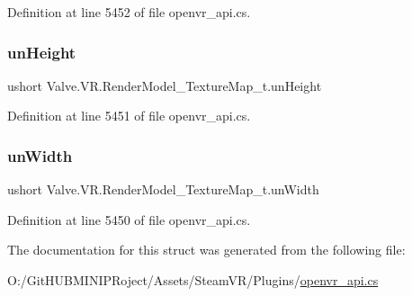 Definition at line 5452 of file openvr\+\_\+api.\+cs.

\mbox{\label{struct_valve_1_1_v_r_1_1_render_model___texture_map__t_aa332e5d1d5260294e2f1871d494950e1}} 
\subsubsection{\texorpdfstring{unHeight}{unHeight}}
{\footnotesize\ttfamily ushort Valve.\+V\+R.\+Render\+Model\+\_\+\+Texture\+Map\+\_\+t.\+un\+Height}



Definition at line 5451 of file openvr\+\_\+api.\+cs.

\mbox{\label{struct_valve_1_1_v_r_1_1_render_model___texture_map__t_a5c41ef258b936bf72da8fdc4d1024fa7}} 
\subsubsection{\texorpdfstring{unWidth}{unWidth}}
{\footnotesize\ttfamily ushort Valve.\+V\+R.\+Render\+Model\+\_\+\+Texture\+Map\+\_\+t.\+un\+Width}



Definition at line 5450 of file openvr\+\_\+api.\+cs.



The documentation for this struct was generated from the following file\+:\begin{DoxyCompactItemize}
\item 
O\+:/\+Git\+H\+U\+B\+M\+I\+N\+I\+P\+Roject/\+Assets/\+Steam\+V\+R/\+Plugins/\mbox{\hyperlink{openvr__api_8cs}{openvr\+\_\+api.\+cs}}\end{DoxyCompactItemize}
